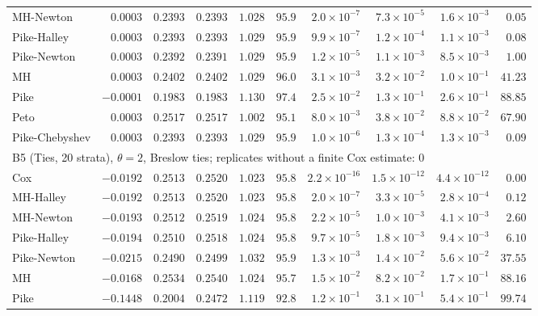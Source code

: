 \begin{landscape}
\begin{longtable}{lrrrrrrrrr}
MH-Newton & $0.0003$ & $0.2393$ & $0.2393$ & $1.028$ & $95.9$ & $2.0 \times 10^{-7}$ & $7.3 \times 10^{-5}$ & $1.6 \times 10^{-3}$ & $0.05$ \\
Pike-Halley & $0.0003$ & $0.2393$ & $0.2393$ & $1.029$ & $95.9$ & $9.9 \times 10^{-7}$ & $1.2 \times 10^{-4}$ & $1.1 \times 10^{-3}$ & $0.08$ \\
Pike-Newton & $0.0003$ & $0.2392$ & $0.2391$ & $1.029$ & $95.9$ & $1.2 \times 10^{-5}$ & $1.1 \times 10^{-3}$ & $8.5 \times 10^{-3}$ & $1.00$ \\
MH & $0.0003$ & $0.2402$ & $0.2402$ & $1.029$ & $96.0$ & $3.1 \times 10^{-3}$ & $3.2 \times 10^{-2}$ & $1.0 \times 10^{-1}$ & $41.23$ \\
Pike & $-0.0001$ & $0.1983$ & $0.1983$ & $1.130$ & $97.4$ & $2.5 \times 10^{-2}$ & $1.3 \times 10^{-1}$ & $2.6 \times 10^{-1}$ & $88.85$ \\
Peto & $0.0003$ & $0.2517$ & $0.2517$ & $1.002$ & $95.1$ & $8.0 \times 10^{-3}$ & $3.8 \times 10^{-2}$ & $8.8 \times 10^{-2}$ & $67.90$ \\
Pike-Chebyshev & $0.0003$ & $0.2393$ & $0.2393$ & $1.029$ & $95.9$ & $1.0 \times 10^{-6}$ & $1.3 \times 10^{-4}$ & $1.3 \times 10^{-3}$ & $0.09$ \\
\multicolumn{10}{l}{B5 (Ties, 20 strata), $\theta = 2$, Breslow ties; replicates without a finite Cox estimate: 0} \\
Cox & $-0.0192$ & $0.2513$ & $0.2520$ & $1.023$ & $95.8$ & $2.2 \times 10^{-16}$ & $1.5 \times 10^{-12}$ & $4.4 \times 10^{-12}$ & $0.00$ \\
MH-Halley & $-0.0192$ & $0.2513$ & $0.2520$ & $1.023$ & $95.8$ & $2.0 \times 10^{-7}$ & $3.3 \times 10^{-5}$ & $2.8 \times 10^{-4}$ & $0.12$ \\
MH-Newton & $-0.0193$ & $0.2512$ & $0.2519$ & $1.024$ & $95.8$ & $2.2 \times 10^{-5}$ & $1.0 \times 10^{-3}$ & $4.1 \times 10^{-3}$ & $2.60$ \\
Pike-Halley & $-0.0194$ & $0.2510$ & $0.2518$ & $1.024$ & $95.8$ & $9.7 \times 10^{-5}$ & $1.8 \times 10^{-3}$ & $9.4 \times 10^{-3}$ & $6.10$ \\
Pike-Newton & $-0.0215$ & $0.2490$ & $0.2499$ & $1.032$ & $95.9$ & $1.3 \times 10^{-3}$ & $1.4 \times 10^{-2}$ & $5.6 \times 10^{-2}$ & $37.55$ \\
MH & $-0.0168$ & $0.2534$ & $0.2540$ & $1.024$ & $95.7$ & $1.5 \times 10^{-2}$ & $8.2 \times 10^{-2}$ & $1.7 \times 10^{-1}$ & $88.16$ \\
Pike & $-0.1448$ & $0.2004$ & $0.2472$ & $1.119$ & $92.8$ & $1.2 \times 10^{-1}$ & $3.1 \times 10^{-1}$ & $5.4 \times 10^{-1}$ & $99.74$ \\

\end{longtable}
\end{landscape}
